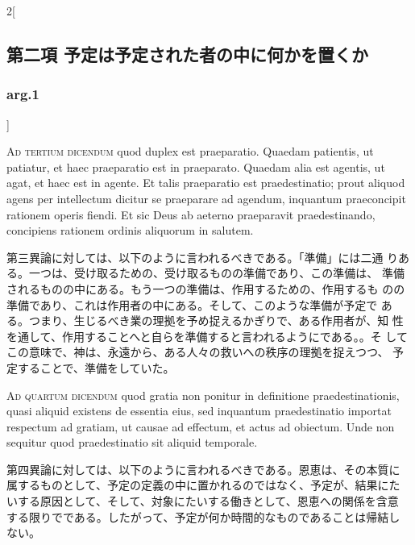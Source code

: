 \documentclass[paper=a4paper,fontsize=10pt,jafontsize=9pt,titlepage]{jlreq}
\begin{document}
\begin{paracol}{2}[\subsection{第二項 予定は予定された者の中に何かを置くか}\subsubsection{arg.1}]
\switchcolumn*[\subsubsection{ad.3}]


{\scshape Ad tertium dicendum} quod duplex est
praeparatio. Quaedam patientis, ut patiatur, et haec praeparatio est in
praeparato. Quaedam alia est agentis, ut agat, et haec est in agente. Et
talis praeparatio est praedestinatio; prout aliquod agens per
intellectum dicitur se praeparare ad agendum, inquantum praeconcipit
rationem operis fiendi. Et sic Deus ab aeterno praeparavit
praedestinando, concipiens rationem ordinis aliquorum in salutem.


\switchcolumn


第三異論に対しては、以下のように言われるべきである。「準備」には二通
りある。一つは、受け取るための、受け取るものの準備であり、この準備は、
準備されるものの中にある。もう一つの準備は、作用するための、作用するも
のの準備であり、これは作用者の中にある。そして、このような準備が予定で
ある。つまり、生じるべき業の理拠を予め捉えるかぎりで、ある作用者が、知
性を通して、作用することへと自らを準備すると言われるようにである。。そ
してこの意味で、神は、永遠から、ある人々の救いへの秩序の理拠を捉えつつ、
予定することで、準備をしていた。


\switchcolumn*[\subsubsection{ad.4}]


{\scshape Ad quartum dicendum} quod gratia non ponitur
in definitione praedestinationis, quasi aliquid existens de essentia
eius, sed inquantum praedestinatio importat respectum ad gratiam, ut
causae ad effectum, et actus ad obiectum. Unde non sequitur quod
praedestinatio sit aliquid temporale.


\switchcolumn


第四異論に対しては、以下のように言われるべきである。恩恵は、その本質に
属するものとして、予定の定義の中に置かれるのではなく、予定が、結果にた
いする原因として、そして、対象にたいする働きとして、恩恵への関係を含意
する限りでである。したがって、予定が何か時間的なものであることは帰結し
ない。


\switchcolumn*



\end{paracol}
\newpage
\end{document}
